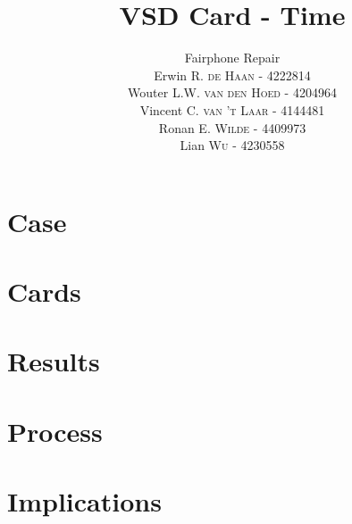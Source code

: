 \documentclass[final]{scrartcl} %
\title{VSD Card - Time}
\author{Fairphone Repair \\
Erwin R. \textsc{de Haan} - 4222814\\
Wouter L.W. \textsc{van den Hoed} - 4204964 \\
Vincent C. \textsc{van 't Laar} - 4144481 \\
Ronan E. \textsc{Wilde} - 4409973 \\
Lian \textsc{Wu} - 4230558 \\}
\begin{document}
\maketitle
\section{Case}
\section{Cards}
\section{Results}
\section{Process}
\section{Implications}

\printbibliography
\end{document}

